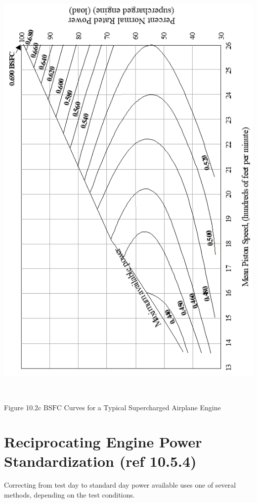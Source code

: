 \documentclass[
]{book}
\begin{document}
\includegraphics[width=5.74931in,height=8.56111in]{media/10/image10.png}

Figure 10.2c \(\mathrm{BSFC}\) Curves for a Typical Supercharged Airplane Engine

\hypertarget{reciprocating-engine-power-standardization-ref-10.5.4}{%
\section{Reciprocating Engine Power Standardization (ref 10.5.4)}\label{reciprocating-engine-power-standardization-ref-10.5.4}}

Correcting from test day to standard day power available uses one of several methods, depending on the test conditions.
\end{document}
